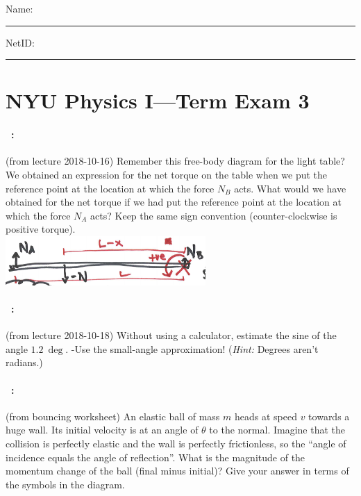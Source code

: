 \documentclass[12pt]{article}
\begin{document}
\noindent
Name: \rule[-1ex]{0.55\textwidth}{0.1pt}
NetID: \rule[-1ex]{0.2\textwidth}{0.1pt}

\section*{NYU Physics I---Term Exam 3}

\paragraph{\problemname~\theproblem:}%
(from lecture 2018-10-16)
Remember this free-body diagram for the light table? We obtained an expression
for the net torque on the table when we put the reference point at the location
at which the force $N_B$ acts.
What would we have obtained for the net torque if we had put the reference point
at the location at which the force $N_A$ acts?
Keep the same sign convention (counter-clockwise is positive torque).\\
\includegraphics[width=3in]{../jpg/light_table.jpg}

\vfill

\paragraph{\problemname~\theproblem:}%
(from lecture 2018-10-18)
Without using a calculator, estimate the sine of the angle $1.2~\deg$.
-Use the small-angle approximation! (\emph{Hint:} Degrees aren't radians.)

\vfill

\paragraph{\problemname~\theproblem:}%
(from bouncing worksheet)
An elastic ball of mass $m$ heads at speed $v$ towards a huge wall.
Its initial velocity is at an angle of $\theta$ to the normal.
Imagine that the collision is perfectly elastic and the
wall is perfectly frictionless, so the ``angle of incidence equals the
angle of reflection''. What is the magnitude of the momentum change of the ball (final
minus initial)?
Give your answer in terms of the symbols in the diagram.
\end{document}
